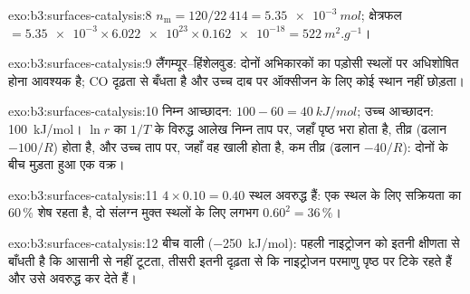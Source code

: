 \begin{solution}{exo:b3:surfaces-catalysis:8}
$n_{\mathrm m} = 120/22\,414 = \qty{5.35e-3}{mol}$; क्षेत्रफल $= \num{5.35e-3} \times \num{6.022e23} \times \num{0.162e-18} =
\qty{522}{m^2.g^{-1}}$।
\end{solution}

\begin{solution}{exo:b3:surfaces-catalysis:9}
लैंगम्यूर--हिंशेलवुड: दोनों अभिकारकों का पड़ोसी स्थलों पर अधिशोषित होना आवश्यक है;
CO दृढ़ता से बँधता है और उच्च दाब पर ऑक्सीजन के लिए कोई स्थान नहीं छोड़ता।
\end{solution}

\begin{solution}{exo:b3:surfaces-catalysis:10}
निम्न आच्छादन: $100 - 60 = \qty{40}{kJ/mol}$; उच्च आच्छादन: \qty{100}{kJ/mol}। $\ln r$ का
$1/T$ के विरुद्ध आलेख निम्न ताप पर, जहाँ पृष्ठ भरा होता है, तीव्र (ढलान $-100/R$) होता है,
और उच्च ताप पर, जहाँ वह खाली होता है, कम तीव्र (ढलान $-40/R$): दोनों के बीच
मुड़ता हुआ एक वक्र।
\end{solution}

\begin{solution}{exo:b3:surfaces-catalysis:11}
$4 \times 0.10 = 0.40$ स्थल अवरुद्ध हैं: एक स्थल के लिए सक्रियता का 60\,\% शेष रहता है,
दो संलग्न मुक्त स्थलों के लिए लगभग $0.60^2 = 36\,\%$।
\end{solution}

\begin{solution}{exo:b3:surfaces-catalysis:12}
बीच वाली (\qty{-250}{kJ/mol}): पहली नाइट्रोजन को इतनी क्षीणता से बाँधती है कि  आसानी से
नहीं टूटता, तीसरी इतनी दृढ़ता से कि नाइट्रोजन परमाणु पृष्ठ पर टिके रहते हैं
और उसे अवरुद्ध कर देते हैं।
\end{solution}

